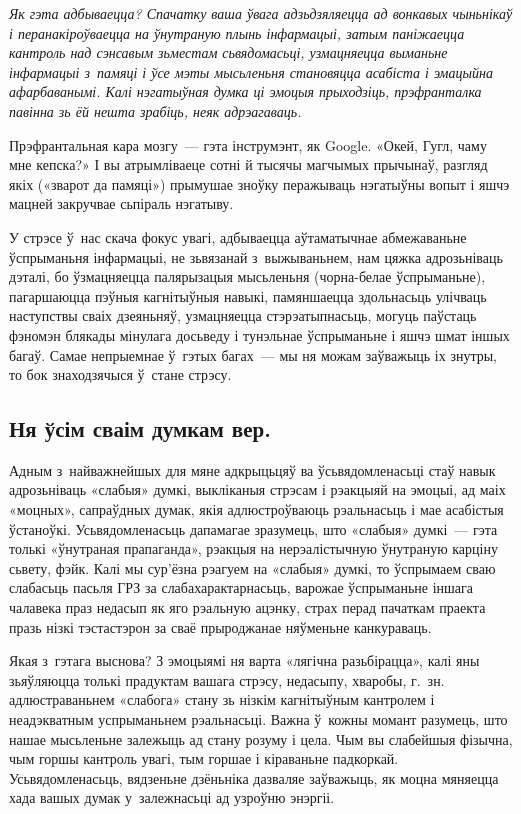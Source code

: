 \emph{Як гэта адбываецца? Спачатку ваша ўвага адзьдзяляецца ад вонкавых чыньнікаў і перанакіроўваецца на ўнутраную плынь інфармацыі, затым паніжаецца кантроль над сэнсавым зьместам сьвядомасьці, узмацняецца выманьне інфармацыі з~памяці і ўсе мэты мысьленьня становяцца асабіста і эмацыйна афарбаванымі. Калі нэгатыўная думка ці эмоцыя прыходзіць, прэфранталка павінна зь ёй нешта зрабіць, неяк адрэагаваць.}

Прэфрантальная кара мозгу~--- гэта інструмэнт, як Google. «Окей, Гугл, чаму мне кепска?» І вы атрымліваеце сотні й тысячы магчымых прычынаў, разгляд якіх («зварот да памяці») прымушае зноўку перажываць нэгатыўны вопыт і яшчэ мацней закручвае сьпіраль нэгатыву.

У стрэсе ў~нас скача фокус увагі, адбываецца аўтаматычнае абмежаваньне ўспрыманьня інфармацыі, не зьвязанай з~выжываньнем, нам цяжка адрозьніваць дэталі, бо ўзмацняецца палярызацыя мысьленьня (чорна-белае ўспрыманьне), пагаршаюцца пэўныя кагнітыўныя навыкі, памяншаецца здольнасьць улічваць наступствы сваіх дзеяньняў, узмацняецца стэрэатыпнасьць, могуць паўстаць фэномэн блякады мінулага досьведу і тунэльнае ўспрыманьне і яшчэ шмат іншых багаў. Самае непрыемнае ў~гэтых багах~--- мы ня можам заўважыць іх знутры, то бок знаходзячыся ў~стане стрэсу.

\subsection*{Ня ўсім сваім думкам вер.}

Адным з~найважнейшых для мяне адкрыцьцяў ва ўсьвядомленасьці стаў навык адрозьніваць «слабыя» думкі, выкліканыя стрэсам і рэакцыяй на эмоцыі, ад маіх «моцных», сапраўдных думак, якія адлюстроўваюць рэальнасьць і мае асабістыя ўстаноўкі. Усьвядомленасьць дапамагае зразумець, што «слабыя» думкі~--- гэта толькі «ўнутраная прапаганда», рэакцыя на нерэалістычную ўнутраную карціну сьвету, фэйк. Калі мы сур'ёзна рэагуем на «слабыя» думкі, то ўспрымаем сваю слабасьць пасьля ГРЗ за слабахарактарнасьць, варожае ўспрыманьне іншага чалавека праз недасып як яго рэальную ацэнку, страх перад пачаткам праекта празь нізкі тэстастэрон за сваё прыроджанае няўменьне канкураваць. 

Якая з~гэтага выснова? З эмоцыямі ня варта «лягічна разьбірацца», калі яны зьяўляюцца толькі прадуктам вашага стрэсу, недасыпу, хваробы, г.~зн. адлюстраваньнем «слабога» стану зь нізкім кагнітыўным кантролем і неадэкватным успрыманьнем рэальнасьці. Важна ў~кожны момант разумець, што нашае мысьленьне залежыць ад стану розуму і цела. Чым вы слабейшыя фізычна, чым горшы кантроль увагі, тым горшае і кіраваньне падкоркай. Усьвядомленасьць, вядзеньне дзёньніка дазваляе заўважыць, як моцна мяняецца хада вашых думак у~залежнасьці ад узроўню энэргіі.

